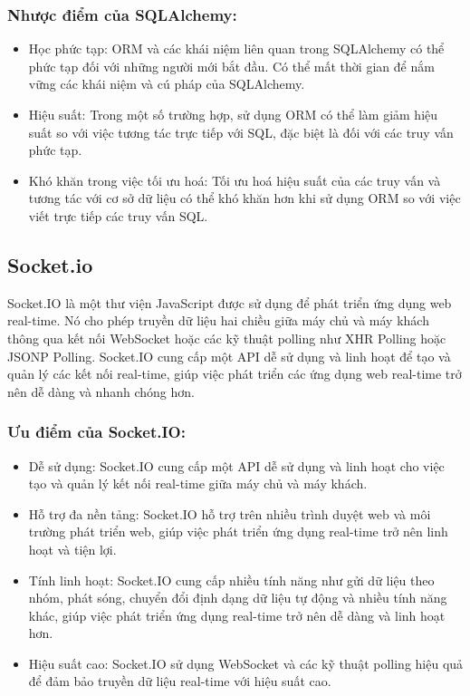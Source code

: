 \documentclass[a4paper]{article}
\begin{document}
\subsubsection{Nhược điểm của SQLAlchemy:}
\begin{itemize}
	\item Học phức tạp: ORM và các khái niệm liên quan trong SQLAlchemy có thể phức tạp đối với những người mới bắt đầu. Có thể mất thời gian để nắm vững các khái niệm và cú pháp của SQLAlchemy.
    \item Hiệu suất: Trong một số trường hợp, sử dụng ORM có thể làm giảm hiệu suất so với việc tương tác trực tiếp với SQL, đặc biệt là đối với các truy vấn phức tạp.
    \item Khó khăn trong việc tối ưu hoá: Tối ưu hoá hiệu suất của các truy vấn và tương tác với cơ sở dữ liệu có thể khó khăn hơn khi sử dụng ORM so với việc viết trực tiếp các truy vấn SQL.
\end{itemize}

\subsection{Socket.io}
Socket.IO là một thư viện JavaScript được sử dụng để phát triển ứng dụng web real-time. Nó cho phép truyền dữ liệu hai chiều giữa máy chủ và máy khách thông qua kết nối WebSocket hoặc các kỹ thuật polling như XHR Polling hoặc JSONP Polling. Socket.IO cung cấp một API dễ sử dụng và linh hoạt để tạo và quản lý các kết nối real-time, giúp việc phát triển các ứng dụng web real-time trở nên dễ dàng và nhanh chóng hơn.
\subsubsection{Ưu điểm của Socket.IO:}
\begin{itemize}
	\item Dễ sử dụng: Socket.IO cung cấp một API dễ sử dụng và linh hoạt cho việc tạo và quản lý kết nối real-time giữa máy chủ và máy khách.
    \item Hỗ trợ đa nền tảng: Socket.IO hỗ trợ trên nhiều trình duyệt web và môi trường phát triển web, giúp việc phát triển ứng dụng real-time trở nên linh hoạt và tiện lợi.
    \item Tính linh hoạt: Socket.IO cung cấp nhiều tính năng như gửi dữ liệu theo nhóm, phát sóng, chuyển đổi định dạng dữ liệu tự động và nhiều tính năng khác, giúp việc phát triển ứng dụng real-time trở nên dễ dàng và linh hoạt hơn.
    \item Hiệu suất cao: Socket.IO sử dụng WebSocket và các kỹ thuật polling hiệu quả để đảm bảo truyền dữ liệu real-time với hiệu suất cao.
\end{itemize}
\end{document}
